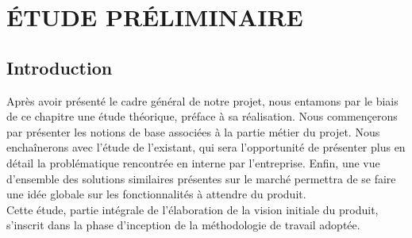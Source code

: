 \setcounter{chapter}{1}
\chapter{          ÉTUDE PRÉLIMINAIRE}
\minitoc %
\graphicspath{{Chapitre2/figures/}}


\pagestyle{fancy}
\fancyhf{}
\fancyhead[R]{\bfseries\rightmark}
\fancyfoot[R]{\thepage}
\renewcommand{\headrulewidth}{0.5pt}
\renewcommand{\footrulewidth}{0pt}
\renewcommand{\chaptermark}[1]{\markboth{\MakeUppercase{\chaptername~\thechapter. #1 }}{}}
\renewcommand{\sectionmark}[1]{\markright{\thechapter.\thesection~ #1}}

\begin{spacing}{1.5}

\section*{Introduction}
Après avoir présenté le cadre général de notre projet, nous entamons par le biais de ce chapitre une étude théorique, préface à sa réalisation. Nous commençerons par présenter les notions de base associées à la partie métier du projet. Nous enchaînerons avec l'étude de l'existant, qui sera l'opportunité de présenter plus en détail la problématique rencontrée en interne par l'entreprise. Enfin, une vue d'ensemble des solutions similaires présentes sur le marché permettra de se faire une idée globale sur les fonctionnalités à attendre du produit.\\
Cette étude, partie intégrale de l'élaboration de la vision initiale du produit, s'inscrit dans la phase d'inception de la méthodologie de travail adoptée.



\end{spacing}
